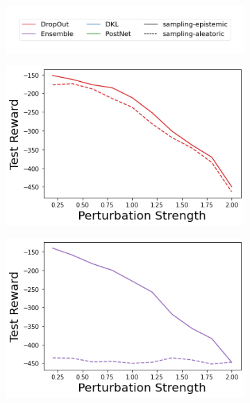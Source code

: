 \begin{figure}
    \centering
    \begin{subfigure}{.45\textwidth}
        \includegraphics[width=\textwidth]{sections/011_icml2022/resources/sampling-legend.png}
    \end{subfigure}
    \vspace{-3mm}
    
    \begin{subfigure}{.245\textwidth}
        \includegraphics[width=\textwidth]{sections/011_icml2022/resources/action_shift-DropOut-AcrobotShift-v0-mean_reward_.png}
    \end{subfigure}
    \begin{subfigure}{.245\textwidth}
        \includegraphics[width=\textwidth]{sections/011_icml2022/resources/action_shift-Ensemble-AcrobotShift-v0-mean_reward_.png}

\end{subfigure}
\end{figure}
